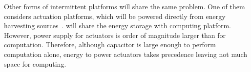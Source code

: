 Other forms of intermittent platforms will share the same problem. One of them considers actuation platforms, which will be powered directly from energy harvesting sources~\cite{}. will share the energy storage with computing platform. However, power supply for actuators is order of magnitude larger than for computation. Therefore, although capacitor is large enough to perform computation alone, energy to power actuators takes precedence leaving not much space for computing.




